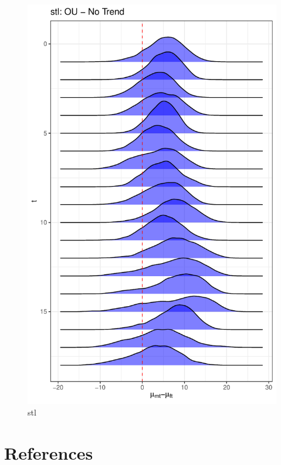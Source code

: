 \documentclass[
  12pt,
]{article}
\begin{document}
\begin{figure}

{\centering \includegraphics[width=0.9\linewidth]{../Figures/stl/mu_diff} 

}

\caption{stl}\label{fig:unnamed-chunk-21}
\end{figure}

\hypertarget{references}{%
\section*{References}\label{references}}
\end{document}

